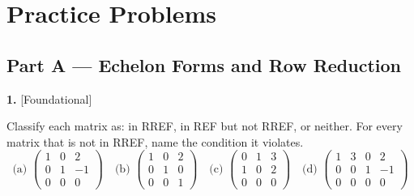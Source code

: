 \documentclass[11pt]{article}
\begin{document}
\section*{\large\color{ink} Practice Problems}
\subsection*{\normalsize\color{ink} Part A --- Echelon Forms and Row Reduction}
\begin{minipage}{\linewidth}\textbf{1.} \hfill{\scriptsize\color{ink}[Foundational]}\par\nopagebreak Classify each matrix as: in RREF, in REF but not RREF, or neither. For every matrix that is not in RREF, name the condition it violates. $$\text{(a) }\begin{pmatrix}1 & 0 & 2 \\ 0 & 1 & -1 \\ 0 & 0 & 0\end{pmatrix}\quad \text{(b) }\begin{pmatrix}1 & 0 & 2 \\ 0 & 1 & 0 \\ 0 & 0 & 1\end{pmatrix}\quad\text{(c) }\begin{pmatrix}0 & 1 & 3 \\ 1 & 0 & 2 \\ 0 & 0 & 0\end{pmatrix}\quad\text{(d) }\begin{pmatrix}1 & 3 & 0 & 2 \\ 0 & 0 & 1 & -1 \\ 0 & 0 & 0 & 0\end{pmatrix}$$
\end{minipage}\par\nopagebreak
\end{document}
